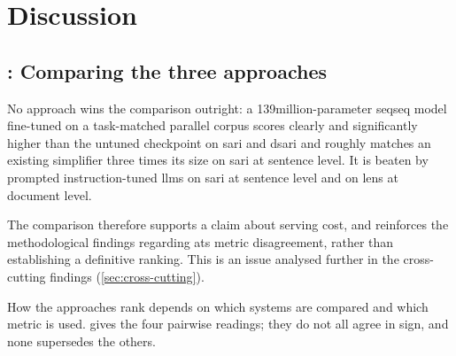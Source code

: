 \chapter{Discussion}
\label{sec:discussion}

\section{: Comparing the three approaches}
\label{sec:rq1}

No approach wins the comparison outright:
a 139\gls{million}-parameter \gls{seqseq} model fine-tuned on a task-matched parallel corpus scores clearly and significantly higher than the untuned checkpoint on \gls{sari} and \gls{dsari} and roughly matches an existing simplifier three times its size on \gls{sari} at sentence level.
It is beaten by prompted instruction-tuned \glspl{llm} on \gls{sari} at sentence level and on \gls{lens} at document level.

The comparison therefore supports a claim about serving cost, and reinforces the methodological findings regarding \gls{ats} metric disagreement, rather than establishing a definitive ranking.
This is an issue analysed further in the cross-cutting findings (\cref{sec:cross-cutting}).

How the approaches rank depends on which systems are compared and which metric is used.
 gives the four pairwise readings; they do not all agree in sign, and none supersedes the others.


